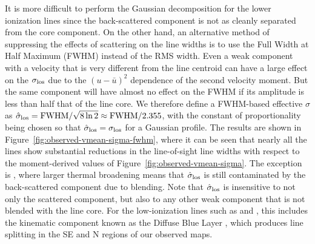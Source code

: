 \documentclass[useAMS,usenatbib]{mn2e}
\begin{document}
It is more difficult to perform the Gaussian decomposition for the
lower ionization lines since the back-scattered component is not as
cleanly separated from the core component.  On the other hand, an
alternative method of suppressing the effects of scattering on the
line widths is to use the Full Width at Half Maximum (FWHM) instead of
the RMS width.  Even a weak component with a velocity that is very
different from the line centroid can have a large effect on the
\(\sigma_{\mathrm{los}}\) due to the \((u - \bar{u})^2\) dependence of the second
velocity moment.  But the same component will have almost no effect on
the FWHM if its amplitude is less than half that of the line core.  We
therefore define a FWHM-based effective \(\sigma\) as
\(\hat{\sigma}_{\mathrm{los}} = \mathrm{FWHM} / \sqrt{8 \ln 2} \approx
\mathrm{FWHM} / 2.355\), with the constant of proportionality being
chosen so that \(\hat{\sigma}_{\mathrm{los}} = \sigma_{\mathrm{los}}\) for a Gaussian profile.  The
results are shown in Figure~\ref{fig:observed-vmean-sigma-fwhm}, where
it can be seen that nearly all the lines show substantial reductions
in the line-of-sight line widths with respect to the moment-derived
values of Figure~\ref{fig:observed-vmean-sigma}.  The exception is
\ha{}, where larger thermal broadening means that \(\hat{\sigma}_{\mathrm{los}}\) is
still contaminated by the back-scattered component due to blending.
Note that \(\hat{\sigma}_{\mathrm{los}}\) is insensitive to not only the scattered
component, but also to any other weak component that is not blended
with the line core.  For the low-ionization lines such as \nii{} and
\sii{}, this includes the kinematic component known as the Diffuse
Blue Layer \citep{Deharveng:1973a}, which produces line splitting in
the SE and N regions of our observed maps.  
\end{document}
